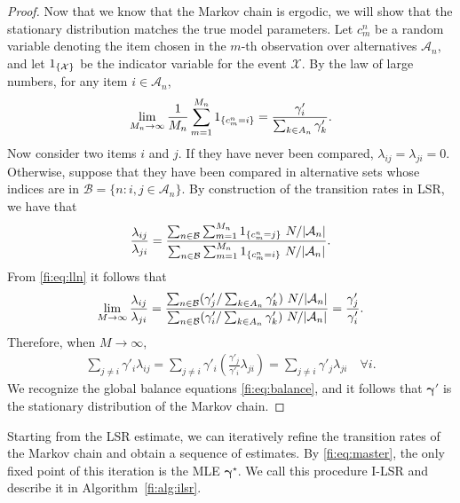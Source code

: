 \begin{proof}
Now that we know that the Markov chain is ergodic, we will show that the stationary distribution matches the true model parameters.
Let $c^n_m$ be a random variable denoting the item chosen in the $m$-th observation over alternatives $\mathcal{A}_n$, and let
$1_{\left \{ \mathcal{X} \right \} }$ be the indicator variable for the event $\mathcal{X}$.
By the law of large numbers, for any item $i \in \mathcal{A}_n$,
\begin{align}
\label{fi:eq:lln}
\lim_{M_n \to \infty} \frac{1}{M_n} \sum_{m = 1}^{M_n} 1_{\left \{ c^n_m = i \right \} } = \frac{\gamma'_i}{\sum_{k \in A_n} \gamma'_k}.
\end{align}
Now consider two items $i$ and $j$.
If they have never been compared, $\lambda_{ij} = \lambda_{ji} = 0$.
Otherwise, suppose that they have been compared in alternative sets whose indices are in $\mathcal{B} = \{ n : i, j \in \mathcal{A}_n \}$.
By construction of the transition rates in LSR, we have that
\begin{align*}
\frac{\lambda_{ij}}{\lambda_{ji}}
= \frac{\sum_{n \in \mathcal{B}} \sum_{m = 1}^{M_n} \Indic{c^n_m = j} \ N / \Abs{\mathcal{A}_n}}
       {\sum_{n \in \mathcal{B}} \sum_{m = 1}^{M_n} \Indic{c^n_m = i} \ N / \Abs{\mathcal{A}_n}}.
\end{align*}
From \eqref{fi:eq:lln} it follows that
\begin{align*}
\lim_{M \to \infty}\frac{\lambda_{ij}}{\lambda_{ji}}
    = \frac{\sum_{n \in \mathcal{B}} (\gamma'_j / \sum_{k \in A_n} \gamma'_k) \ N / \lvert\mathcal{A}_n\rvert}
         {\sum_{n \in \mathcal{B}} (\gamma'_i / \sum_{k \in A_n} \gamma'_k) \ N / \lvert\mathcal{A}_n\rvert}
    = \frac{\gamma'_j }{\gamma'_i}.
\end{align*}
Therefore, when $M \to \infty$,
\begin{align*}
\sum_{j \ne i} \gamma'_i \lambda_{ij} = \sum_{j \ne i} \gamma'_i \left( \frac{\gamma'_j}{\gamma'_i} \lambda_{ji} \right)
                                    = \sum_{j \ne i} \gamma'_j \lambda_{ji}  \quad \forall i.
\end{align*}
We recognize the global balance equations \eqref{fi:eq:balance}, and it follows that $\bm{\gamma}'$ is the stationary distribution of the Markov chain.
\end{proof}

Starting from the LSR estimate, we can iteratively refine the transition rates of the Markov chain and obtain a sequence of estimates.
By \eqref{fi:eq:master}, the only fixed point of this iteration is the MLE $\bm{\gamma}^\star$.
We call this procedure I-LSR and describe it in Algorithm~\ref{fi:alg:ilsr}.


